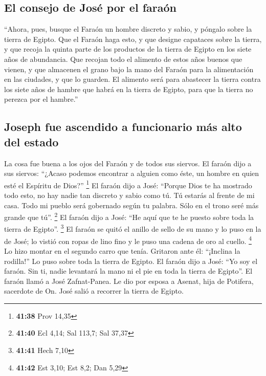 \begin{paracol}{2}
\hypertarget{el-consejo-de-josuxe9-por-el-farauxf3n}{%
\subsection{El consejo de José por el
faraón}\label{el-consejo-de-josuxe9-por-el-farauxf3n}}

 ``Ahora, pues, busque el Faraón un hombre discreto y
sabio, y póngalo sobre la tierra de Egipto.  Que el
Faraón haga esto, y que designe capataces sobre la tierra, y que recoja
la quinta parte de los productos de la tierra de Egipto en los siete
años de abundancia.  Que recojan todo el alimento de
estos años buenos que vienen, y que almacenen el grano bajo la mano del
Faraón para la alimentación en las ciudades, y que lo guarden.
 El alimento será para abastecer la tierra contra los
siete años de hambre que habrá en la tierra de Egipto, para que la
tierra no perezca por el hambre.''

\hypertarget{joseph-fue-ascendido-a-funcionario-muxe1s-alto-del-estado}{%
\subsection{Joseph fue ascendido a funcionario más alto del
estado}\label{joseph-fue-ascendido-a-funcionario-muxe1s-alto-del-estado}}

 La cosa fue buena a los ojos del Faraón y de todos sus
siervos.  El faraón dijo a sus siervos: ``¿Acaso podemos
encontrar a alguien como éste, un hombre en quien esté el Espíritu de
Dios?'' \footnote{\textbf{41:38} Prov 14,35}  El faraón
dijo a José: ``Porque Dios te ha mostrado todo esto, no hay nadie tan
discreto y sabio como tú.  Tú estarás al frente de mi
casa. Todo mi pueblo será gobernado según tu palabra. Sólo en el trono
seré más grande que tú''. \footnote{\textbf{41:40} Ecl 4,14; Sal 113,7;
  Sal 37,37}  El faraón dijo a José: ``He aquí que te he
puesto sobre toda la tierra de Egipto''. \footnote{\textbf{41:41} Hech
  7,10}  El faraón se quitó el anillo de sello de su mano
y lo puso en la de José; lo vistió con ropas de lino fino y le puso una
cadena de oro al cuello. \footnote{\textbf{41:42} Est 3,10; Est 8,2; Dan
  5,29}  Lo hizo montar en el segundo carro que tenía.
Gritaron ante él: ``¡Inclina la rodilla!'' Lo puso sobre toda la tierra
de Egipto.  El faraón dijo a José: ``Yo soy el faraón.
Sin ti, nadie levantará la mano ni el pie en toda la tierra de Egipto''.
 El faraón llamó a José Zafnat-Panea. Le dio por esposa a
Asenat, hija de Potifera, sacerdote de On. José salió a recorrer la
tierra de Egipto.


\end{paracol}
